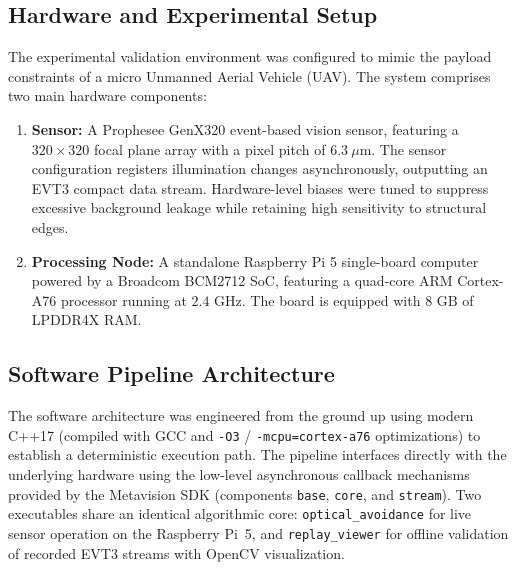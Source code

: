 \documentclass[conference]{IEEEtran}
\begin{document}
\subsection{Hardware and Experimental Setup}
The experimental validation environment was configured to mimic the payload constraints of a micro Unmanned Aerial Vehicle (UAV). The system comprises two main hardware components:
\begin{enumerate}
    \item \textbf{Sensor:} A Prophesee GenX320 event-based vision sensor, featuring a $320 \times 320$ focal plane array with a pixel pitch of $6.3\ \mu\text{m}$. The sensor configuration registers illumination changes asynchronously, outputting an EVT3 compact data stream. Hardware-level biases were tuned to suppress excessive background leakage while retaining high sensitivity to structural edges.
    \item \textbf{Processing Node:} A standalone Raspberry Pi 5 single-board computer powered by a Broadcom BCM2712 SoC, featuring a quad-core ARM Cortex-A76 processor running at $2.4\text{ GHz}$. The board is equipped with $8\text{ GB}$ of LPDDR4X RAM.
\end{enumerate}

\subsection{Software Pipeline Architecture}
The software architecture was engineered from the ground up using modern C++17 (compiled with GCC and \texttt{-O3} / \texttt{-mcpu=cortex-a76} optimizations) to establish a deterministic execution path. The pipeline interfaces directly with the underlying hardware using the low-level asynchronous callback mechanisms provided by the Metavision SDK (components \texttt{base}, \texttt{core}, and \texttt{stream}). Two executables share an identical algorithmic core: \texttt{optical\_avoidance} for live sensor operation on the Raspberry Pi~5, and \texttt{replay\_viewer} for offline validation of recorded EVT3 streams with OpenCV visualization.
\end{document}
